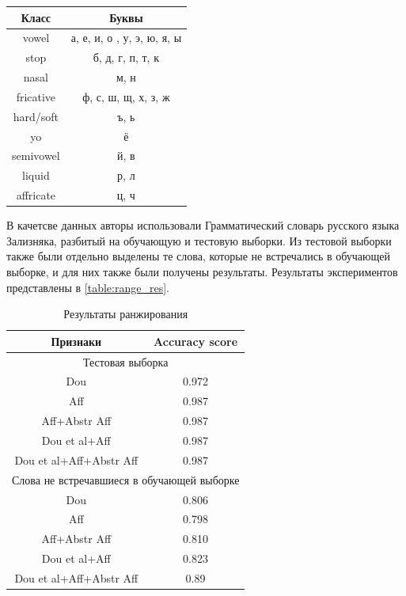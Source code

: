 \documentclass[14pt, a4paper, russian]{report}
\begin{document}
\begin{normalsize}
\begin{table}[H]
	\begin{small}
		\begin{center}
			\begin{tabular}{|c|c|}
				\hline
				Класс & Буквы \\			
				\hline
				vowel & а, е, и, о , у, э, ю, я, ы \\
				\hline
				stop & б, д, г, п, т, к \\
				\hline
				nasal & м, н \\
				\hline
				fricative & ф, с, ш, щ, х, з, ж \\
\hline
				hard/soft & ъ, ь\\
\hline
				yo & ё \\
\hline
				semivowel & й, в \\
\hline
				liquid & р, л\\
\hline
				affricate & ц, ч \\
\hline
		
			\end{tabular}
		\end{center}
	\end{small}
	\label{table:phon_class}
\end{table}

В качетсве данных авторы использовали Грамматический словарь русского языка Зализняка\cite{zaliz}, разбитый на обучающую и тестовую выборки. Из тестовой выборки также были отдельно выделены те слова, которые не встречались в обучающей выборке,  и для них также были получены  результаты. Результаты экспериментов представлены в \cref{table:range_res}.
\begin{table}[H]
		\caption{Результаты ранжирования}

	\begin{small}
		\begin{center}
			\begin{tabular}{|c|c|}
				\hline
				Признаки & Accuracy score \\
				\hline
				\multicolumn{2}{|c|}{Тестовая выборка} \\			
				\hline
				Dou &0.972 \\
				\hline
				Aff & 0.987 \\
				\hline
				Aff+Abstr Aff & 0.987 \\
				\hline
				Dou et al+Aff & 0.987 \\
				\hline
				Dou et al+Aff+Abstr Aff & 0.987 \\
				\hline
				\multicolumn{2}{|c|}{Слова не встречавшиеся в обучающей выборке} \\			
				\hline
				Dou &0.806 \\
				\hline
				Aff & 0.798 \\
				\hline
				Aff+Abstr Aff & 0.810 \\
				\hline
				Dou et al+Aff & 0.823 \\
				\hline
				Dou et al+Aff+Abstr Aff & 0.89 \\
				\hline
				

\end{tabular}
\end{center}
\end{small}
\end{table}
\end{normalsize}
\end{document}
